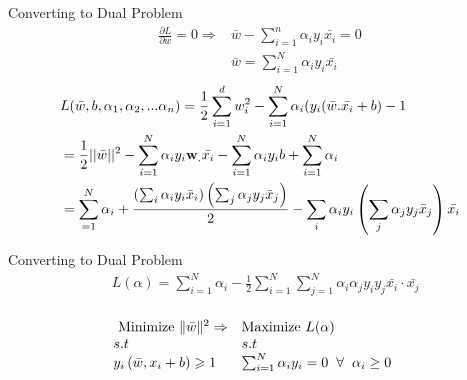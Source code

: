 \documentclass{beamer}
\begin{document}
\begin{frame}{Converting to Dual Problem}
\begin{align*}
\frac{\partial L}{\partial w} = 0 \Rightarrow & \bar{w} - \sum_{i=1}^{n}\alpha_{i}y_{i}\bar{x_{i}} = 0\\
& \bar{w} = \sum_{i=1}^{N}\alpha_{i}y_{i}\bar{x_{i}}
\end{align*}
\begin{align*}
&L(\bar{w},b,\alpha_{1},\alpha_{2},...\alpha_{n}) = \frac{1}{2}
\sum_{i = 1}^{d} w_{i}^{2} - \sum_{i=1}^{N} \alpha_{i}(y_{i}(\bar{w}.\bar{x_i} + b) -1\\
&= \frac{1}{2}||\bar{w}||^{2}-\sum_{i=1}^{N} \alpha_{i} y_{i} \mathbf{w}_{.} \bar{x_{i}}-\sum_{i=1}^{N} \alpha_{i} y_{i} b+\sum_{i=1}^{N} \alpha_{i}\\
&= \sum_{=1}^{N} \alpha_{i}+\frac{\left(\sum_{i} \alpha_{i} y_{i} \bar{x}_{i}\right)\left(\sum_{j} \alpha_{j} y_{j} \bar{x}_{j}\right)}{2}-\sum_{i} \alpha_{i} y_{i}\left(\sum_{j} \alpha_{j} y_{j} \bar{x}_{j}\right) \bar{x_{i}}
\end{align*}
\end{frame}

\begin{frame}{Converting to Dual Problem}
\begin{align*}
&L(\alpha)=\sum_{i=1}^{N} \alpha_{i}-\frac{1}{2} \sum_{i=1}^{N} \sum_{j=1}^{N} \alpha_{i} \alpha_{j} y_{i} y_{j} \bar{x_{i}} \cdot \bar{x_{j}}\\
\end{align*}
\begin{tcolorbox}
\begin{align*}
&\begin{array}{ll}
{\text { Minimize }\|\bar{w}\|^{2} \Rightarrow}&{\text{Maximize } L(\alpha)} \\
{  s.t  } & {  s.t  } \\
{y_{i}\left(\bar{w}, x_{i}+b\right) \geqslant 1} & {\sum_{i=1}^{N} \alpha_{i} y_{i}=0 \hspace{2mm}\forall \hspace{2mm} \alpha_{i}  \geq 0}
\end{array}
\end{align*}
\end{tcolorbox}
\end{frame}
\end{document}
